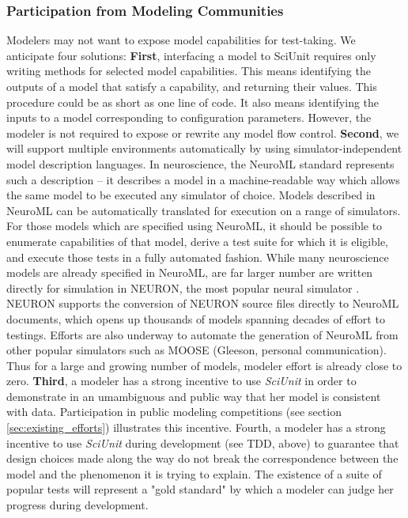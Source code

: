 \documentclass[11pt,letterpaper]{article}
\begin{document}
\subsubsection{Participation from Modeling Communities}
Modelers may not want to expose model capabilities for test-taking.  We anticipate four solutions: \textbf{First}, interfacing a model to SciUnit requires only writing methods for selected model capabilities.  This means identifying the outputs of a model that satisfy a capability, and returning their values.  This procedure could be as short as one line of code.  It also means identifying the inputs to a model corresponding to configuration parameters.  However, the modeler is not required to expose or rewrite any model flow control.  \textbf{Second}, we will support multiple environments automatically by using simulator-independent model description languages. In neuroscience, the NeuroML standard represents such a description \cite{gleeson_neuroml:_2010} -- it describes a model in a machine-readable way which allows the same model to be executed any simulator of choice.  Models described in NeuroML can be automatically translated for execution on a range of simulators.  For those models which are specified using NeuroML, it should be possible to enumerate capabilities of that model, derive a test suite for which it is eligible, and execute those tests in a fully automated fashion.  While many neuroscience models are already specified in NeuroML, are far larger number are written directly for simulation in NEURON, the most popular neural simulator \cite{neuron_url,carnevale_neuron_2006}.  NEURON supports the conversion of NEURON source files directly to NeuroML documents, which opens up thousands of models spanning decades of effort to testings.  Efforts are also underway to automate the generation of NeuroML from other popular simulators such as MOOSE (Gleeson, personal communication).  Thus for a large and growing number of models, modeler effort is already close to zero.  \textbf{Third}, a modeler has a strong incentive to use \textit{SciUnit} in order to demonstrate in an umambiguous and public way that her model is consistent with data.  Participation in public modeling competitions (see section \ref{sec:existing_efforts}) illustrates this incentive.  Fourth, a modeler has a strong incentive to use \textit{SciUnit} during development (see TDD, above) to guarantee that design choices made along the way do not break the correspondence between the model and the phenomenon it is trying to explain.  The existence of a suite of popular tests will represent a "gold standard" by which a modeler can judge her progress during development.
\end{document}
